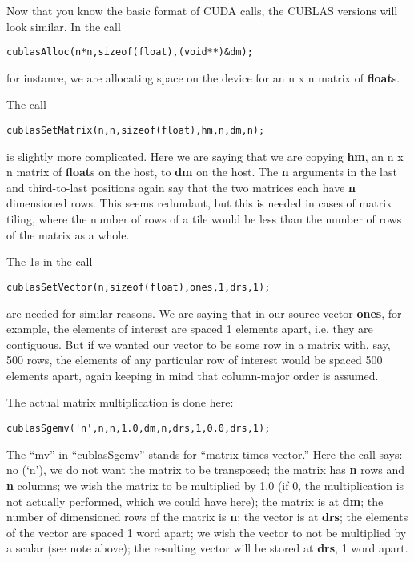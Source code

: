 Now that you know the basic format of CUDA calls, the CUBLAS versions
will look similar.  In the call

\begin{Verbatim}[fontsize=\relsize{-2}]
cublasAlloc(n*n,sizeof(float),(void**)&dm);
\end{Verbatim}

for instance, we are allocating space on the device for an n x n
matrix of {\bf float}s.

The call 

\begin{Verbatim}[fontsize=\relsize{-2}]
cublasSetMatrix(n,n,sizeof(float),hm,n,dm,n);
\end{Verbatim}

is slightly more complicated.  Here we are saying that we are copying
{\bf hm}, an n x n matrix of {\bf float}s on the host, to {\bf dm} on
the host.  The {\bf n} arguments in the last and third-to-last positions
again say that the two matrices each have {\bf n} dimensioned rows.
This seems redundant, but this is needed in cases of matrix tiling,
where the number of rows of a tile would be less than the number of rows
of the matrix as a whole.

The 1s in the call 

\begin{Verbatim}[fontsize=\relsize{-2}]
cublasSetVector(n,sizeof(float),ones,1,drs,1);
\end{Verbatim} 

are needed for similar reasons.  We are saying that in our source vector
{\bf ones}, for example, the elements of interest are spaced 1 elements
apart, i.e. they are contiguous.  But if we wanted our vector to be some
row in a matrix with, say, 500 rows, the elements of any particular row
of interest  would be spaced 500 elements apart, again keeping in mind
that column-major order is assumed.

The actual matrix multiplication is done here:

\begin{Verbatim}[fontsize=\relsize{-2}]
cublasSgemv('n',n,n,1.0,dm,n,drs,1,0.0,drs,1);
\end{Verbatim}

The ``mv'' in ``cublasSgemv'' stands for ``matrix times vector.''  Here
the call says:  no (`n'), we do not want the matrix to be transposed;
the matrix has {\bf n} rows and {\bf n} columns; we wish the matrix to
be multiplied by 1.0 (if 0, the multiplication is not actually
performed, which we could have here); the matrix is at {\bf dm}; the
number of dimensioned rows of the matrix is {\bf n}; the vector is at
{\bf drs}; the elements of the vector are spaced 1 word apart; we wish
the vector to not be multiplied by a scalar (see note above); the
resulting vector will be stored at {\bf drs}, 1 word apart.

